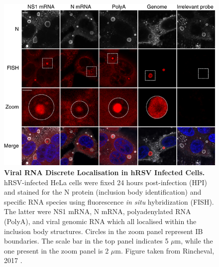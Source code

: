 \begin{figure}
    \centering
    \includegraphics[width=1\linewidth]{04. Introduction/Figs/11. RSV IBs.png}  
    \caption[Viral RNA Discrete Localisation in hRSV Infected Cells.]{\textbf{Viral RNA Discrete Localisation in hRSV Infected Cells.} hRSV-infected HeLa cells were fixed 24 hours post-infection (HPI) and stained for the N protein (inclusion body identification) and specific RNA species using fluorescence \textit{in situ} hybridization (FISH). The latter were NS1 mRNA, N mRNA, polyadenylated RNA (PolyA), and viral genomic RNA which all localised within the inclusion body structures. Circles in the zoom panel represent IB boundaries. The scale bar in the top panel indicates 5 \(\mu\)m, while the one present in the zoom panel is 2 \(\mu\)m. Figure taken from Rincheval, 2017 \cite{Rincheval2017FunctionalVirus}.}
    \label{fig:Viral RNA Discrete Localisation in hRSV Infected Cells}
\end{figure}

